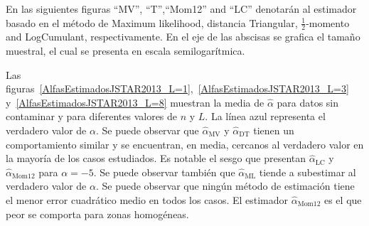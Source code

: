 En las siguientes figuras ``MV'', ``T'',``Mom12'' and ``LC'' denotarán al estimador basado en el método de Maximum likelihood, distancia Triangular, $\frac{1}{2}$-momento and LogCumulant, respectivamente. En el eje de las abscisas se grafica el tamaño muestral, el cual se presenta en escala semilogarítmica.

Las figuras~\ref{AlfasEstimadosJSTAR2013_L=1},~\ref{AlfasEstimadosJSTAR2013_L=3} y~\ref{AlfasEstimadosJSTAR2013_L=8} muestran la media de $\widehat{\alpha}$ para datos sin contaminar y para diferentes valores de $n$ y $L$. La línea azul representa el verdadero valor de $\alpha$. Se puede observar que $\widehat{\alpha}_{\text{MV}}$ y $\widehat{\alpha}_{\text{DT}}$ tienen un comportamiento similar y se encuentran, en media, cercanos al verdadero valor en la mayoría de los casos estudiados. Es notable el sesgo que presentan  $\widehat{\alpha}_{\text{LC}}$ y $\widehat{\alpha}_{\text{Mom12}}$ para $\alpha=-5$. Se puede observar también que $\widehat\alpha_{\text{ML}}$ tiende a subestimar al verdadero valor de $\alpha$.
Se puede observar que ningún método de estimación tiene el menor error cuadrático medio en todos los casos. El estimador $\widehat{\alpha}_{\text{Mom12}}$ es el que peor se comporta para zonas homogéneas.

